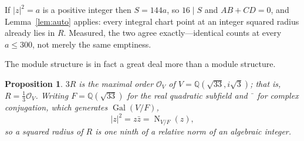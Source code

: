 \documentclass[11pt,reqno]{amsart}
\theoremstyle{plain}
\newtheorem{proposition}[theorem]{Proposition}
\theoremstyle{definition}
\newcommand{\Q}{\mathbb{Q}}
\newcommand{\Lat}{R}
\newcommand{\Ok}{\mathcal{O}}
\newcommand{\Gal}{\operatorname{Gal}}
\DeclareMathOperator{\Nm}{N}
\begin{document}
If $\lvert z\rvert^2 = a$ is a positive integer then $S = 144a$, so $16 \mid S$
and $AB + CD = 0$, and Lemma~\ref{lem:auto} applies: every integral chart point
at an integer squared radius already lies in $\Lat$. Measured, the two agree
exactly---identical counts at every $a \le 300$, not merely the same emptiness.

The module structure is in fact a great deal more than a module structure.

\begin{proposition}\label{prop:order}
$3\Lat$ is the maximal order $\Ok_V$ of $V = \Q(\sqrt{33}, i\sqrt3)$; that is,
$\Lat = \tfrac13\Ok_V$. Writing $F = \Q(\sqrt{33})$ for the real quadratic
subfield and $\bar{\phantom{z}}$ for complex conjugation, which generates
$\Gal(V/F)$,
\[
  \lvert z \rvert^2 = z\bar z = \Nm_{V/F}(z),
\]
so a squared radius of $\Lat$ is one ninth of a relative norm of an algebraic
integer.
\end{proposition}
\end{document}
